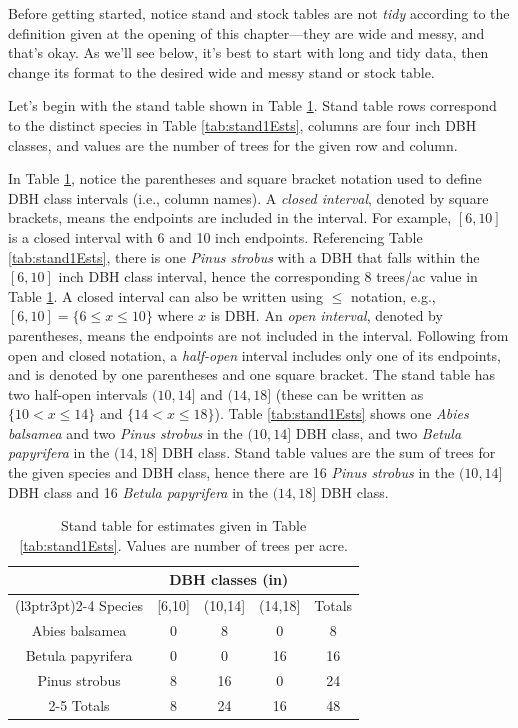 \documentclass[
  11pt,
]{krantz}
\theoremstyle{definition}
\theoremstyle{definition}
\theoremstyle{definition}
\theoremstyle{definition}
\theoremstyle{remark}
\begin{document}
Before getting started, notice stand and stock tables are not \emph{tidy} according to the definition given at the opening of this chapter---they are wide and messy, and that's okay. As we'll see below, it's best to start with long and tidy data, then change its format to the desired wide and messy stand or stock table.

Let's begin with the stand table shown in Table \ref{tab:stand1Stand}. Stand table rows correspond to the distinct species in Table \ref{tab:stand1Ests}, columns are four inch DBH classes, and values are the number of trees for the given row and column.

In Table \ref{tab:stand1Stand}, notice the parentheses and square bracket notation used to define DBH class intervals (i.e., column names). A \emph{closed interval}, denoted by square brackets, means the endpoints are included in the interval. For example, \([6, 10]\) is a closed interval with 6 and 10 inch endpoints. Referencing Table \ref{tab:stand1Ests}, there is one \emph{Pinus strobus} with a DBH that falls within the \([6, 10]\) inch DBH class interval, hence the corresponding 8 trees/ac value in Table \ref{tab:stand1Stand}. A closed interval can also be written using \(\le\) notation, e.g., \([6, 10]=\{6 \le x \le 10\}\) where \(x\) is DBH. An \emph{open interval}, denoted by parentheses, means the endpoints are not included in the interval. Following from open and closed notation, a \emph{half-open} interval includes only one of its endpoints, and is denoted by one parentheses and one square bracket. The stand table has two half-open intervals \((10, 14]\) and \((14, 18]\) (these can be written as \(\{10 < x \le 14\}\) and \(\{14 < x \le 18\}\)). Table \ref{tab:stand1Ests} shows one \emph{Abies balsamea} and two \emph{Pinus strobus} in the \((10, 14]\) DBH class, and two \emph{Betula papyrifera} in the \((14, 18]\) DBH class. Stand table values are the sum of trees for the given species and DBH class, hence there are 16 \emph{Pinus strobus} in the \((10, 14]\) DBH class and 16 \emph{Betula papyrifera} in the \((14, 18]\) DBH class.

\begin{table}[!h]

\caption{\label{tab:stand1Stand}Stand table for estimates given in Table \ref{tab:stand1Ests}. Values are number of trees per acre.}
\centering
\begin{tabular}[t]{ccccc}
\toprule
\multicolumn{1}{c}{ } & \multicolumn{3}{c}{DBH classes (in)} & \multicolumn{1}{c}{ } \\
\cmidrule(l{3pt}r{3pt}){2-4}
Species & {}[6,10] & (10,14] & (14,18] & Totals\\
\midrule
Abies balsamea & 0 & 8 & 0 & 8\\
Betula papyrifera & 0 & 0 & 16 & 16\\
Pinus strobus & 8 & 16 & 0 & 24\\
\cline{2-5}
Totals & 8 & 24 & 16 & 48\\
\bottomrule
\end{tabular}
\end{table}
\end{document}
